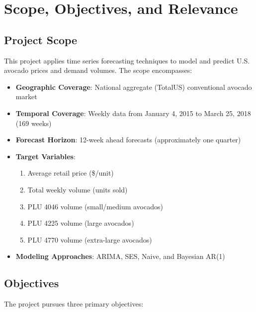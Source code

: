 \documentclass[12pt]{article}
\begin{document}
\newpage

\section{Scope, Objectives, and Relevance}
\label{sec:scope}

\subsection{Project Scope}

This project applies time series forecasting techniques to model and predict U.S. avocado prices and demand volumes. The scope encompasses:

\begin{itemize}
    \item \textbf{Geographic Coverage}: National aggregate (TotalUS) conventional avocado market
    \item \textbf{Temporal Coverage}: Weekly data from January 4, 2015 to March 25, 2018 (169 weeks)
    \item \textbf{Forecast Horizon}: 12-week ahead forecasts (approximately one quarter)
    \item \textbf{Target Variables}:
    \begin{enumerate}
        \item Average retail price (\$/unit)
        \item Total weekly volume (units sold)
        \item PLU 4046 volume (small/medium avocados)
        \item PLU 4225 volume (large avocados)
        \item PLU 4770 volume (extra-large avocados)
    \end{enumerate}
    \item \textbf{Modeling Approaches}: ARIMA, SES, Naive, and Bayesian AR(1)
\end{itemize}

\subsection{Objectives}

The project pursues three primary objectives:
\end{document}
